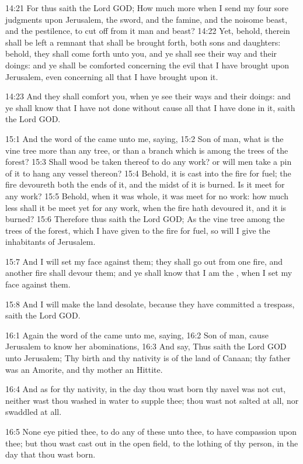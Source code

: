 14:21 For thus saith the Lord GOD; How much more when I send my four sore judgments upon Jerusalem, the sword, and the famine, and the noisome beast, and the pestilence, to cut off from it man and beast?  14:22 Yet, behold, therein shall be left a remnant that shall be brought forth, both sons and daughters: behold, they shall come forth unto you, and ye shall see their way and their doings: and ye shall be comforted concerning the evil that I have brought upon Jerusalem, even concerning all that I have brought upon it.

14:23 And they shall comfort you, when ye see their ways and their doings: and ye shall know that I have not done without cause all that I have done in it, saith the Lord GOD.

15:1 And the word of the \LORD came unto me, saying, 15:2 Son of man, what is the vine tree more than any tree, or than a branch which is among the trees of the forest?  15:3 Shall wood be taken thereof to do any work? or will men take a pin of it to hang any vessel thereon?  15:4 Behold, it is cast into the fire for fuel; the fire devoureth both the ends of it, and the midst of it is burned. Is it meet for any work?  15:5 Behold, when it was whole, it was meet for no work: how much less shall it be meet yet for any work, when the fire hath devoured it, and it is burned?  15:6 Therefore thus saith the Lord GOD; As the vine tree among the trees of the forest, which I have given to the fire for fuel, so will I give the inhabitants of Jerusalem.

15:7 And I will set my face against them; they shall go out from one fire, and another fire shall devour them; and ye shall know that I am the \LORD, when I set my face against them.

15:8 And I will make the land desolate, because they have committed a trespass, saith the Lord GOD.

16:1 Again the word of the \LORD came unto me, saying, 16:2 Son of man, cause Jerusalem to know her abominations, 16:3 And say, Thus saith the Lord GOD unto Jerusalem; Thy birth and thy nativity is of the land of Canaan; thy father was an Amorite, and thy mother an Hittite.

16:4 And as for thy nativity, in the day thou wast born thy navel was not cut, neither wast thou washed in water to supple thee; thou wast not salted at all, nor swaddled at all.

16:5 None eye pitied thee, to do any of these unto thee, to have compassion upon thee; but thou wast cast out in the open field, to the lothing of thy person, in the day that thou wast born.

